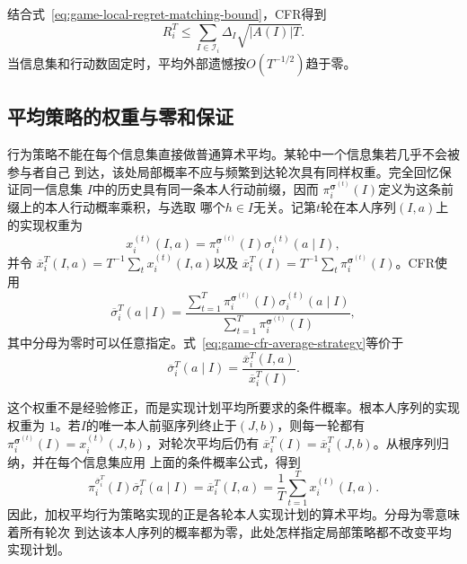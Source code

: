 结合式~\eqref{eq:game-local-regret-matching-bound}，CFR得到
\begin{equation}
  R_i^T
  \leq
  \sum_{I\in\mathcal{I}_i}
  \Delta_I\sqrt{|A(I)|T}.
  \label{eq:game-cfr-rate}
\end{equation}
当信息集和行动数固定时，平均外部遗憾按\(O(T^{-1/2})\)趋于零。

\subsection{平均策略的权重与零和保证}

行为策略不能在每个信息集直接做普通算术平均。某轮中一个信息集若几乎不会被参与者自己
到达，该处局部概率不应与频繁到达轮次具有同样权重。完全回忆保证同一信息集
\(I\)中的历史具有同一条本人行动前缀，因而
\(\pi_i^{\bm{\sigma}^{(t)}}(I)\)定义为这条前缀上的本人行动概率乘积，与选取
哪个\(h\in I\)无关。记第\(t\)轮在本人序列\((I,a)\)上的实现权重为
\[
  x_i^{(t)}(I,a)
  =
  \pi_i^{\bm{\sigma}^{(t)}}(I)
  \sigma_i^{(t)}(a\mid I),
\]
并令
\(\overline{x}_i^T(I,a)=T^{-1}\sum_t x_i^{(t)}(I,a)\)以及
\(\overline{x}_i^T(I)=T^{-1}\sum_t
\pi_i^{\bm{\sigma}^{(t)}}(I)\)。CFR使用
\begin{equation}
  \overline{\sigma}_i^T(a\mid I)
  =
  \frac{
    \sum_{t=1}^{T}
    \pi_i^{\bm{\sigma}^{(t)}}(I)
    \sigma_i^{(t)}(a\mid I)
  }{
    \sum_{t=1}^{T}
    \pi_i^{\bm{\sigma}^{(t)}}(I)
  },
  \label{eq:game-cfr-average-strategy}
\end{equation}
其中分母为零时可以任意指定。式~\eqref{eq:game-cfr-average-strategy}等价于
\[
  \overline{\sigma}_i^T(a\mid I)
  =
  \frac{\overline{x}_i^T(I,a)}{\overline{x}_i^T(I)}.
\]

这个权重不是经验修正，而是实现计划平均所要求的条件概率。根本人序列的实现权重为
\(1\)。若\(I\)的唯一本人前驱序列终止于\((J,b)\)，则每一轮都有
\(\pi_i^{\bm{\sigma}^{(t)}}(I)=x_i^{(t)}(J,b)\)，对轮次平均后仍有
\(\overline{x}_i^T(I)=\overline{x}_i^T(J,b)\)。从根序列归纳，并在每个信息集应用
上面的条件概率公式，得到
\begin{equation}
  \pi_i^{\overline{\sigma}_i^T}(I)
  \overline{\sigma}_i^T(a\mid I)
  =
  \overline{x}_i^T(I,a)
  =
  \frac{1}{T}\sum_{t=1}^{T}x_i^{(t)}(I,a).
  \label{eq:game-average-realization-plan}
\end{equation}
因此，加权平均行为策略实现的正是各轮本人实现计划的算术平均。分母为零意味着所有轮次
到达该本人序列的概率都为零，此处怎样指定局部策略都不改变平均实现计划。

